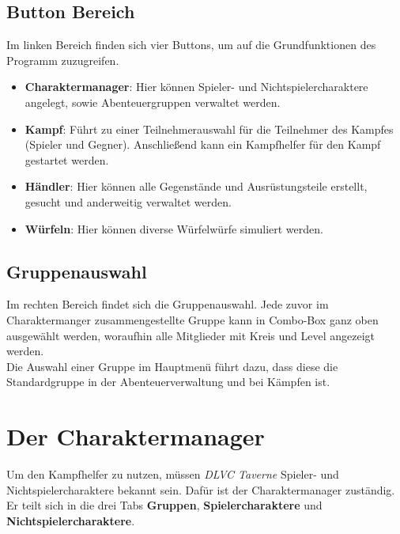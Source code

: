 \documentclass[11pt, a4paper, german]{article}
\begin{document}
\subsection{Button Bereich}
Im linken Bereich finden sich vier Buttons, um auf die Grundfunktionen des Programm zuzugreifen.
\begin{itemize}
	\item[] \textbf{Charaktermanager}: Hier können Spieler- und Nichtspielercharaktere angelegt, sowie Abenteuergruppen verwaltet werden.
	\item[] \textbf{Kampf}: Führt zu einer Teilnehmerauswahl für die Teilnehmer des Kampfes (Spieler und Gegner). Anschließend kann ein Kampfhelfer für den Kampf gestartet werden.
	\item[] \textbf{Händler}: Hier können alle Gegenstände und Ausrüstungsteile erstellt, gesucht und anderweitig verwaltet werden.
	\item[] \textbf{Würfeln}: Hier können diverse Würfelwürfe simuliert werden.
\end{itemize}

\subsection{Gruppenauswahl}\label{subsection:gruppenauswahl}
Im rechten Bereich findet sich die Gruppenauswahl. Jede zuvor im Charaktermanger zusammengestellte Gruppe kann in Combo-Box ganz oben ausgewählt werden, woraufhin alle Mitglieder mit Kreis und Level angezeigt werden.\\
Die Auswahl einer Gruppe im Hauptmenü führt dazu, dass diese die Standardgruppe in der Abenteuerverwaltung und bei Kämpfen ist.

\newpage

\section{Der Charaktermanager}
Um den Kampfhelfer zu nutzen, müssen \textit{DLVC Taverne} Spieler- und Nichtspielercharaktere bekannt sein. Dafür ist der Charaktermanager zuständig. Er teilt sich in die drei Tabs \textbf{Gruppen}, \textbf{Spielercharaktere} und \textbf{Nichtspielercharaktere}.
\end{document}

